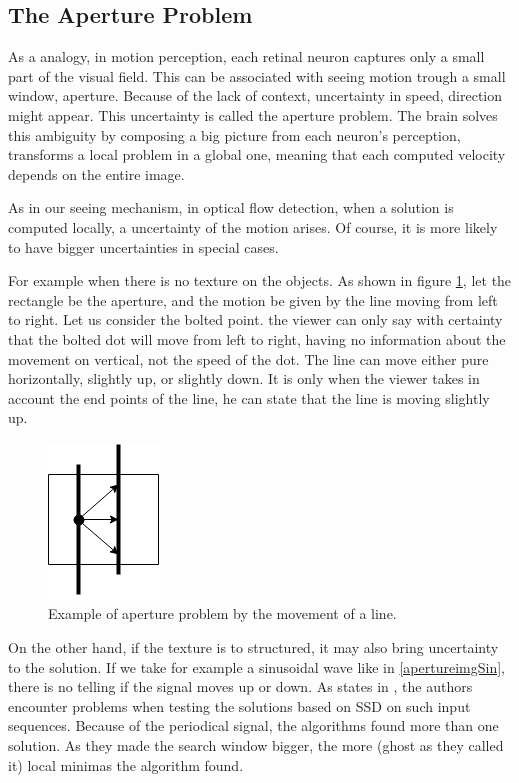 \documentclass[12pt,a4paper,twoside]{report}
\begin{document}
{\subsection{The Aperture Problem}
As a analogy, in motion perception, each retinal neuron captures only a small part of the visual field. This can be associated with seeing motion trough a small window, aperture. Because of the lack of context, uncertainty in speed, direction might appear. This uncertainty is called the aperture problem.
The brain solves this ambiguity by composing a big picture from each neuron's perception, transforms a local problem in a global one, meaning that each computed velocity depends on the entire image.
 
 
As in our seeing mechanism, in optical flow detection, when a solution is computed locally, a uncertainty of the motion arises. Of course, it is more likely to have bigger uncertainties in special cases. 

For example when there is no texture on the objects. As shown in figure \ref{apertureimg}, let the rectangle be the aperture, and the motion be given by the line moving from left to right. Let us consider the bolted point. the viewer can only say with certainty that the bolted dot will move from left to right, having no information about the movement on vertical, not the speed of the dot. The line can move either pure horizontally, slightly up, or slightly down. It is only when the viewer takes in account the end points of the line, he can state that the line is moving slightly up.  

\begin{figure}
	\label{apertureimg}
	\centering
	\includegraphics{img/Aperture}
	\caption{Example of aperture problem by the movement of a line.}
\end{figure}

On the other hand, if the texture is to structured, it may also bring uncertainty to the solution. If we take for example a sinusoidal wave like in \ref{apertureimgSin}, there is no telling if the signal moves up or down. As states in \cite{barron1994}, the authors encounter problems when testing the solutions based on SSD on such input sequences. Because of the periodical signal, the algorithms found more than one solution. As they made the search window bigger, the more (ghost as they called it) local minimas the algorithm found. 

}
\end{document}
